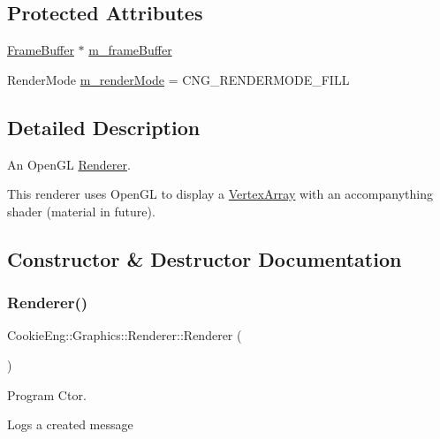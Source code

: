 \subsection*{Protected Attributes}
\begin{DoxyCompactItemize}
\item 
\hyperlink{class_cookie_eng_1_1_graphics_1_1_frame_buffer}{Frame\+Buffer} $\ast$ \hyperlink{class_cookie_eng_1_1_graphics_1_1_renderer_a64f992d6d2476fe2ea641f31a46f006e}{m\+\_\+frame\+Buffer}
\item 
Render\+Mode \hyperlink{class_cookie_eng_1_1_graphics_1_1_renderer_af4068b4414967468816ecea24ae30513}{m\+\_\+render\+Mode} = C\+N\+G\+\_\+\+R\+E\+N\+D\+E\+R\+M\+O\+D\+E\+\_\+\+F\+I\+LL
\end{DoxyCompactItemize}


\subsection{Detailed Description}
An Open\+GL \hyperlink{class_cookie_eng_1_1_graphics_1_1_renderer}{Renderer}. 

This renderer uses Open\+GL to display a \hyperlink{class_cookie_eng_1_1_graphics_1_1_vertex_array}{Vertex\+Array} with an accompanything shader (material in future). 

\subsection{Constructor \& Destructor Documentation}
\mbox{\label{class_cookie_eng_1_1_graphics_1_1_renderer_a255e78964e0d0ff7efd26e60a6612f39}} 
\subsubsection{\texorpdfstring{Renderer()}{Renderer()}}
{\footnotesize\ttfamily Cookie\+Eng\+::\+Graphics\+::\+Renderer\+::\+Renderer (\begin{DoxyParamCaption}{ }\end{DoxyParamCaption})}



Program Ctor. 

Logs a created message 

